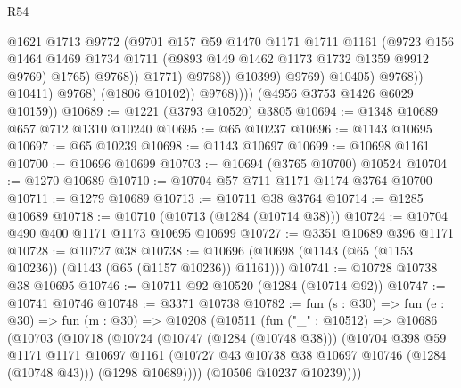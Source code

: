 \begin{lexlean}{R54}
\begin{coremodule}
                                      @1621
                                      @1713
                                      @9772
                                      (@9701
                                        @157
                                        @59
                                        @1470
                                        @1171
                                        @1711
                                        @1161
                                        (@9723
                                          @156
                                          @1464
                                          @1469
                                          @1734
                                          @1711
                                          (@9893 @149 @1462 @1173 @1732 @1359 @9912 @9769)
                                          @1765)
                                        @9768))
                                    @1771)
                                  @9768))
                              @10399)
                            @9769)
                          @10405)
                        @9768))
                    @10411)
                  @9768)
                (@1806 @10102))
              @9768))))
      (@4956 @3753 @1426 @6029 @10159))
@10689 := @1221 (@3793 @10520) @3805
@10694 := @1348 @10689 @657 @712 @1310 @10240
@10695 := @65 @10237
@10696 := @1143 @10695
@10697 := @65 @10239
@10698 := @1143 @10697
@10699 := @10698 @1161
@10700 := @10696 @10699
@10703 := @10694 (@3765 @10700) @10524
@10704 := @1270 @10689
@10710 := @10704 @57 @711 @1171 @1174 @3764 @10700
@10711 := @1279 @10689
@10713 := @10711 @38 @3764
@10714 := @1285 @10689
@10718 := @10710 (@10713 (@1284 (@10714 @38)))
@10724 := @10704 @490 @400 @1171 @1173 @10695 @10699
@10727 := @3351 @10689 @396 @1171
@10728 := @10727 @38
@10738 := @10696 (@10698 (@1143 (@65 (@1153 @10236)) (@1143 (@65 (@1157 @10236)) @1161)))
@10741 := @10728 @10738 @38 @10695
@10746 := @10711 @92 @10520 (@1284 (@10714 @92))
@10747 := @10741 @10746
@10748 := @3371 @10738
@10782 := fun (s : @30) =>
  fun (e : @30) =>
  fun (m : @30) =>
  @10208
    (@10511
      (fun ("_" : @10512) =>
      @10686
        (@10703
          (@10718
            (@10724
              (@10747 (@1284 (@10748 @38)))
              (@10704
                @398
                @59
                @1171
                @1171
                @10697
                @1161
                (@10727 @43 @10738 @38 @10697 @10746 (@1284 (@10748 @43)))
                (@1298 @10689))))
          (@10506 @10237 @10239))))

\end{coremodule}
\end{lexlean}
